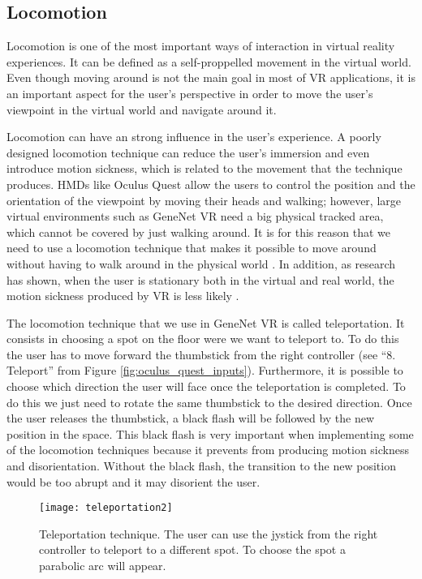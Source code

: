 \subsection{Locomotion}
Locomotion is one of the most important ways of interaction in virtual reality experiences. It can be defined as a self-proppelled movement in the virtual world. Even though moving around is not the main goal in most of VR applications, it is an important aspect for the user's perspective in order to move the user's viewpoint in the virtual world and navigate around it.

Locomotion can have an strong influence in the user's experience. A poorly designed locomotion technique can reduce the user's immersion and even introduce motion sickness, which is related to the movement that the technique produces. HMDs like Oculus Quest allow the users to control the position and the orientation of the viewpoint by moving their heads and walking; however, large virtual environments such as GeneNet VR need a big physical tracked area, which cannot be covered by just walking around. It is for this reason that we need to use a locomotion technique that makes it possible to move around without having to walk around in the physical world \cite{locomotion_technique}. In addition, as research has shown, when the user is stationary both in the virtual and real world, the motion sickness produced by VR is less likely \cite{effect_vr_sickness}.

The locomotion technique that we use in GeneNet VR is called teleportation. It consists in choosing a spot on the floor were we want to teleport to. To do this the user has to move forward the thumbstick from the right controller (see “8. Teleport” from Figure \ref{fig:oculus_quest_inputs}). Furthermore, it is possible to choose which direction the user will face once the teleportation is completed. To do this we just need to rotate the same thumbstick to the desired direction. Once the user releases the thumbstick, a black flash will be followed by the new position in the space. This black flash is very important when implementing some of the locomotion techniques because it prevents from producing motion sickness and disorientation. Without the black flash, the transition to the new position would be too abrupt and it may disorient the user.

\begin{figure}[h!]
    \centering%
    \texttt{[image: teleportation2]}
    \caption{Teleportation technique. The user can use the jystick from the right controller to teleport to a different spot. To choose the spot a parabolic arc will appear.}
    \label{fig:teleportation}
\end{figure}%

